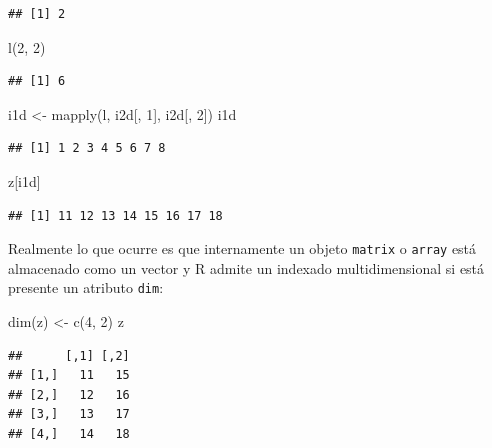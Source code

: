 \documentclass[
]{book}
\newenvironment{Shaded}{\begin{snugshade}}{\end{snugshade}}
\newcommand{\DecValTok}[1]{\textcolor[rgb]{0.00,0.00,0.81}{#1}}
\newcommand{\FunctionTok}[1]{\textcolor[rgb]{0.00,0.00,0.00}{#1}}
\newcommand{\NormalTok}[1]{#1}
\newcommand{\OtherTok}[1]{\textcolor[rgb]{0.56,0.35,0.01}{#1}}
\theoremstyle{break}
\theoremstyle{definition}
\theoremstyle{definition}
\theoremstyle{definition}
\theoremstyle{definition}
\theoremstyle{remark}
\begin{document}
\begin{verbatim}
## [1] 2
\end{verbatim}

\begin{Shaded}
\begin{Highlighting}[]
\FunctionTok{l}\NormalTok{(}\DecValTok{2}\NormalTok{, }\DecValTok{2}\NormalTok{)}
\end{Highlighting}
\end{Shaded}

\begin{verbatim}
## [1] 6
\end{verbatim}

\begin{Shaded}
\begin{Highlighting}[]
\NormalTok{i1d }\OtherTok{\textless{}{-}} \FunctionTok{mapply}\NormalTok{(l, i2d[, }\DecValTok{1}\NormalTok{], i2d[, }\DecValTok{2}\NormalTok{])}
\NormalTok{i1d}
\end{Highlighting}
\end{Shaded}

\begin{verbatim}
## [1] 1 2 3 4 5 6 7 8
\end{verbatim}

\begin{Shaded}
\begin{Highlighting}[]
\NormalTok{z[i1d]}
\end{Highlighting}
\end{Shaded}

\begin{verbatim}
## [1] 11 12 13 14 15 16 17 18
\end{verbatim}

Realmente lo que ocurre es que internamente un objeto \texttt{matrix} o \texttt{array} está almacenado como un vector y R admite un indexado multidimensional si está presente un atributo \texttt{dim}:

\begin{Shaded}
\begin{Highlighting}[]
\FunctionTok{dim}\NormalTok{(z) }\OtherTok{\textless{}{-}} \FunctionTok{c}\NormalTok{(}\DecValTok{4}\NormalTok{, }\DecValTok{2}\NormalTok{)}
\NormalTok{z}
\end{Highlighting}
\end{Shaded}

\begin{verbatim}
##      [,1] [,2]
## [1,]   11   15
## [2,]   12   16
## [3,]   13   17
## [4,]   14   18
\end{verbatim}
\end{document}
